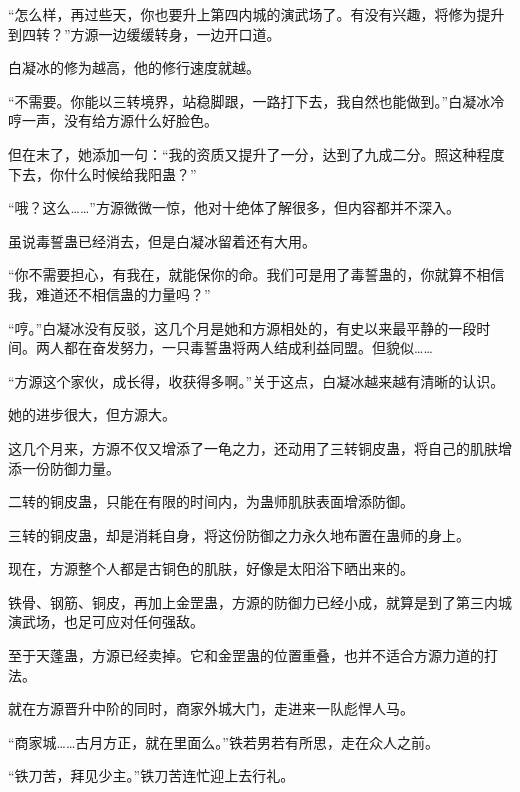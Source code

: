 \begin{this_body}
“怎么样，再过些天，你也要升上第四内城的演武场了。有没有兴趣，将修为提升到四转？”方源一边缓缓转身，一边开口道。

白凝冰的修为越高，他的修行速度就越。

“不需要。你能以三转境界，站稳脚跟，一路打下去，我自然也能做到。”白凝冰冷哼一声，没有给方源什么好脸色。

但在末了，她添加一句：“我的资质又提升了一分，达到了九成二分。照这种程度下去，你什么时候给我阳蛊？”

“哦？这么……”方源微微一惊，他对十绝体了解很多，但内容都并不深入。

虽说毒誓蛊已经消去，但是白凝冰留着还有大用。

“你不需要担心，有我在，就能保你的命。我们可是用了毒誓蛊的，你就算不相信我，难道还不相信蛊的力量吗？”

“哼。”白凝冰没有反驳，这几个月是她和方源相处的，有史以来最平静的一段时间。两人都在奋发努力，一只毒誓蛊将两人结成利益同盟。但貌似……

“方源这个家伙，成长得，收获得多啊。”关于这点，白凝冰越来越有清晰的认识。

她的进步很大，但方源大。

这几个月来，方源不仅又增添了一龟之力，还动用了三转铜皮蛊，将自己的肌肤增添一份防御力量。

二转的铜皮蛊，只能在有限的时间内，为蛊师肌肤表面增添防御。

三转的铜皮蛊，却是消耗自身，将这份防御之力永久地布置在蛊师的身上。

现在，方源整个人都是古铜色的肌肤，好像是太阳浴下晒出来的。

铁骨、钢筋、铜皮，再加上金罡蛊，方源的防御力已经小成，就算是到了第三内城演武场，也足可应对任何强敌。

至于天蓬蛊，方源已经卖掉。它和金罡蛊的位置重叠，也并不适合方源力道的打法。

就在方源晋升中阶的同时，商家外城大门，走进来一队彪悍人马。

“商家城……古月方正，就在里面么。”铁若男若有所思，走在众人之前。

“铁刀苦，拜见少主。”铁刀苦连忙迎上去行礼。

\end{this_body}

